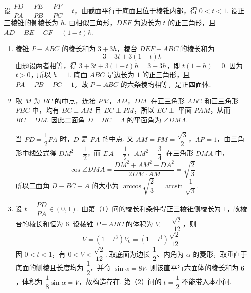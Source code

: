 \begin{solution}
设 \(\dfrac{PD}{PA}=\dfrac{PE}{PB}=\dfrac{PF}{PC}=t\)，由截面平行于底面且位于棱锥内部，得 \(0<t<1\). 设正三棱锥的侧棱长为 \(h\). 由相似三角形，\(DEF\) 为边长为 \(t\) 的正三角形，且 \(AD=BE=CF=(1-t)h\).

\begin{enumerate}
\item 棱锥 \(P-ABC\) 的棱长和为 \(3+3h\)，棱台 \(DEF-ABC\) 的棱长和为
\[
3+3t+3(1-t)h
\]
由题设两者相等，得 \(3+3t+3(1-t)h=3+3h\)，即 \(t(1-h)=0\). 因为 \(t>0\)，所以 \(h=1\). 底面 \(ABC\) 是边长为 \(1\) 的正三角形，且 \(PA=PB=PC=1\)，故 \(P-ABC\) 的六条棱均相等，是正四面体.

\item 取 \(M\) 为 \(BC\) 的中点，连接 \(PM\)，\(AM\)，\(DM\). 在正三角形 \(ABC\) 和正三角形 \(PBC\) 中，均有 \(BC\perp AM\) 且 \(BC\perp PM\)，所以 \(BC\perp\) 平面 \(PAM\)，从而 \(BC\perp DM\). 因此二面角 \(D-BC-A\) 的平面角为 \(\angle DMA\).

当 \(PD=\dfrac12PA\) 时，\(D\) 是 \(PA\) 的中点. 又 \(AM=PM=\dfrac{\sqrt{3}}{2}\)，\(AP=1\)，由三角形中线公式得 \(DM^{2}=\dfrac12\)，而 \(DA=\dfrac12\)，\(AM^{2}=\dfrac34\). 在三角形 \(DMA\) 中，
\[
\cos\angle DMA=\frac{DM^{2}+AM^{2}-DA^{2}}{2DM\cdot AM}=\sqrt{\frac{2}{3}}
\]
所以二面角 \(D-BC-A\) 的大小为 \(\arccos\sqrt{\dfrac{2}{3}}=\arcsin\dfrac{1}{\sqrt{3}}\).

\item 设 \(t=\dfrac{PD}{PA}\in(0,1)\). 由第（1）问的棱长和条件得正三棱锥侧棱长为 \(1\)，故棱台的棱长和恒为 \(6\). 设棱锥 \(P-ABC\) 的体积为 \(V_0=\dfrac{\sqrt2}{12}\)，则
\[
V=\left(1-t^3\right)V_0=\left(1-t^3\right)\frac{\sqrt2}{12}.
\]
因 \(0<t<1\)，有 \(0<V<\dfrac{\sqrt2}{12}\). 取底面为边长 \(\dfrac12\)、内角为 \(\alpha\) 的菱形，取垂直于底面的侧棱且长度均为 \(\dfrac12\)，并令 \(\sin\alpha=8V\). 则该直平行六面体的棱长和为 \(6\)，体积为 \(\dfrac18\sin\alpha=V\)，故构造存在. 第（2）问的 \(t=\dfrac12\) 不能带入本小问.
\end{enumerate}
\end{solution}

